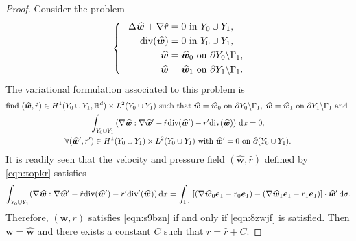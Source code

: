 \documentclass[a4paper,10pt,reqno]{amsart}
\begin{document}
\begin{proof}
    Consider the problem    
    \renewcommand{\w}{\widehat{\bm w}}
    \[
    \left\{\begin{aligned}
            -\Delta \w +\nabla \hat r &= 0 \In Y_0\cup Y_1,\\    
            \div(\w)& = 0 \In Y_0\cup Y_1,\\    
            \w &=  \w_0 \On \partial Y_0\backslash \Gamma_1,\\  
            \w &=  \w_1 \On \partial Y_1 \backslash\Gamma_1.
    \end{aligned}
    \right.
    \] 
    The variational formulation associated to this problem is   
    \begin{multline}
    \text{find }(\w,\hat r)\in H^{1}(Y_0\cup Y_1,\R^{d})\times L^{2}(Y_0\cup Y_1) \text{
    such that }\w=\w_0 \On \partial Y_0\backslash\Gamma_1,\; \w=\w_1 \On \partial
    Y_1\backslash\Gamma_1 \text{ and }\\    
    \int_{Y_0\cup Y_1}\left(\nabla\w:\nabla \w'-\hat r \div(\w') -
    r'\div(\w)\right) \D x =0, \\  \forall (\w',r')\in H^{1}(Y_0\cup Y_1)\times
    L^{2}(Y_0\cup Y_1) \text{ with }\w'=0\On \partial (Y_0\cup Y_1).
    \end{multline} 
    It is readily seen that the velocity and pressure field $(\w,\hat r)$ defined by
    \cref{eqn:topkr} satisfies  
    \[
    \int_{Y_0\cup Y_1}(\nabla\w:\nabla \w'-\hat r\div(\w')-r'\div'(\w))\D x =
    \int_{\Gamma_1}\left[ (\nabla\w_0\e_1-r_0\e_1)-(\nabla \w_1\e_1-r_1\e_1)
    \right]\cdot \w'\D \sigma.
    \] 
    \renewcommand{\w}{{\bm w}}     
    Therefore, $(\w,r)$ satisfies \cref{eqn:s9bzn} if and only if \cref{eqn:8zwjf} is
    satisfied. Then $\w=\hat \w$ and there exists a constant $C$ such that $r=\hat
    r+C$. 
\end{proof}
\end{document}

